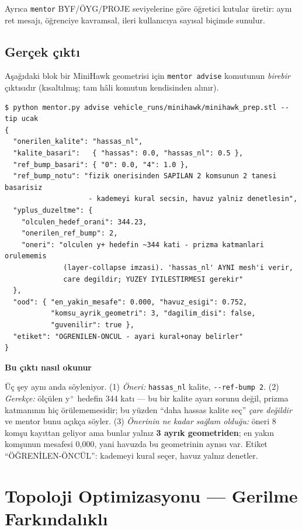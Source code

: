 \documentclass[11pt,a4paper]{article}
\newcommand{\kkkenar}{lacivert}
\newcommand{\kkzemin}{kod}
\newenvironment{renkkutu}[3]{%
  \renewcommand{\kkkenar}{#1}\renewcommand{\kkzemin}{#2}%
  \par\medskip\noindent
  \begin{lrbox}{\kutugovde}%
  \begin{minipage}{\dimexpr\linewidth-2\fboxsep-2\fboxrule\relax}\footnotesize
  \textcolor{#1}{\textbf{#3}}\par\vspace{3pt}%
}{%
  \end{minipage}%
  \end{lrbox}%
  \noindent\fcolorbox{\kkkenar}{\kkzemin}{\usebox{\kutugovde}}%
  \par\medskip
}
\newenvironment{anafikir}[1]{\begin{renkkutu}{lacivert}{kod}{#1}}{\end{renkkutu}}
\begin{document}
Ayrıca \texttt{mentor} BYF/ÖYG/PROJE seviyelerine göre öğretici kutular üretir:
aynı ret mesajı, öğrenciye kavramsal, ileri kullanıcıya sayısal biçimde sunulur.

\subsection*{Gerçek çıktı}

Aşağıdaki blok bir MiniHawk geometrisi için \texttt{mentor advise} komutunun
\emph{birebir} çıktısıdır (kısaltılmış; tam hâli komutun kendisinden alınır).

\begin{lstlisting}
$ python mentor.py advise vehicle_runs/minihawk/minihawk_prep.stl --tip ucak
{
  "onerilen_kalite": "hassas_nl",
  "kalite_basari":   { "hassas": 0.0, "hassas_nl": 0.5 },
  "ref_bump_basari": { "0": 0.0, "4": 1.0 },
  "ref_bump_notu": "fizik onerisinden SAPILAN 2 komsunun 2 tanesi basarisiz
                    - kademeyi kural secsin, havuz yalniz denetlesin",
  "yplus_duzeltme": {
    "olculen_hedef_orani": 344.23,
    "onerilen_ref_bump": 2,
    "oneri": "olculen y+ hedefin ~344 kati - prizma katmanlari orulememis
              (layer-collapse imzasi). 'hassas_nl' AYNI mesh'i verir,
              care degildir; YUZEY IYILESTIRMESI gerekir"
  },
  "ood": { "en_yakin_mesafe": 0.000, "havuz_esigi": 0.752,
           "komsu_ayrik_geometri": 3, "dagilim_disi": false,
           "guvenilir": true },
  "etiket": "OGRENILEN-ONCUL - ayari kural+onay belirler"
}
\end{lstlisting}

\begin{anafikir}{Bu çıktı nasıl okunur}
Üç şey aynı anda söyleniyor. (1) \emph{Öneri:} \texttt{hassas\_nl} kalite,
\texttt{-{}-ref-bump 2}. (2) \emph{Gerekçe:} ölçülen y$^+$ hedefin 344 katı ---
bu bir kalite ayarı sorunu değil, prizma katmanının hiç örülememesidir; bu
yüzden ``daha hassas kalite seç'' \emph{çare değildir} ve mentor bunu açıkça
söyler. (3) \emph{Önerinin ne kadar sağlam olduğu:} öneri 8 komşu kayıttan
geliyor ama bunlar yalnız \textbf{3 ayrık geometriden}; en yakın komşunun
mesafesi 0{,}000, yani havuzda bu geometrinin aynısı var. Etiket
``ÖĞRENİLEN-ÖNCÜL'': kademeyi kural seçer, havuz yalnız denetler.
\end{anafikir}

\section{Topoloji Optimizasyonu --- Gerilme Farkındalıklı}
\label{sec:topopt}
\end{document}
